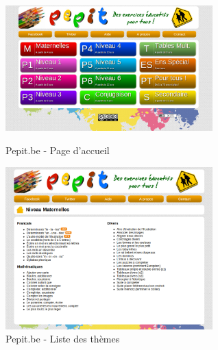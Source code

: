 \begin{figure}[H]
   	\begin{minipage}[c]{.46\linewidth}
		\includegraphics[width=8cm]{images/pepit_be_homepage}
		\caption{Pepit.be - Page d'accueil}
		\label{Pepit.be - Page d'accueil}
   	\end{minipage} \hfill
  	\begin{minipage}[c]{.46\linewidth}
      	\includegraphics[width=8cm]{images/pepit_be_list}
     	\caption{Pepit.be - Liste des thèmes}
		\label{Pepit.be - Liste des thèmes}
   	\end{minipage}
\end{figure}
